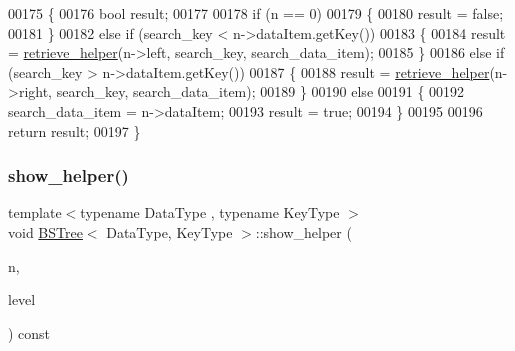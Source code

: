 \begin{DoxyCode}
00175 \{
00176     \textcolor{keywordtype}{bool} result;
00177 
00178     \textcolor{keywordflow}{if} (n == 0)
00179     \{
00180         result = \textcolor{keyword}{false};
00181     \}
00182     \textcolor{keywordflow}{else} \textcolor{keywordflow}{if} (search\_key < n->dataItem.getKey())
00183     \{
00184         result = \hyperlink{class_b_s_tree_ae8721d0a76719bc95e6b48420b5be302}{retrieve\_helper}(n->left, search\_key, search\_data\_item);
00185     \}
00186     \textcolor{keywordflow}{else} \textcolor{keywordflow}{if} (search\_key > n->dataItem.getKey())
00187     \{
00188         result = \hyperlink{class_b_s_tree_ae8721d0a76719bc95e6b48420b5be302}{retrieve\_helper}(n->right, search\_key, search\_data\_item);
00189     \}
00190     \textcolor{keywordflow}{else}
00191     \{
00192         search\_data\_item = n->dataItem;
00193         result = \textcolor{keyword}{true};
00194     \}
00195 
00196     \textcolor{keywordflow}{return} result;
00197 \}
\end{DoxyCode}
\hypertarget{class_b_s_tree_a735864f670b952c5bb2bc2550ade3a72}{}\label{class_b_s_tree_a735864f670b952c5bb2bc2550ade3a72} 
\subsubsection{\texorpdfstring{show\+\_\+helper()}{show\_helper()}}
{\footnotesize\ttfamily template$<$typename Data\+Type , typename Key\+Type $>$ \\
void \hyperlink{class_b_s_tree}{B\+S\+Tree}$<$ Data\+Type, Key\+Type $>$\+::show\+\_\+helper (\begin{DoxyParamCaption}\item[{\hyperlink{class_b_s_tree_1_1_b_s_tree_node}{B\+S\+Tree\+Node} $\ast$}]{n,  }\item[{int}]{level }\end{DoxyParamCaption}) const\hspace{0.3cm}{\ttfamily [protected]}}


